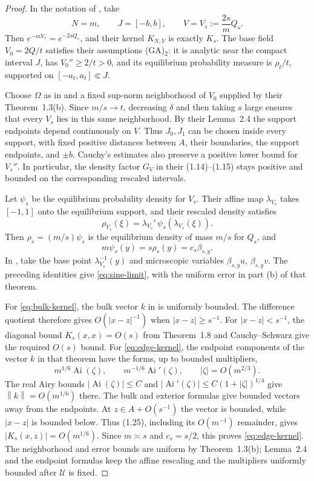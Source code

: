 \documentclass[11pt]{article}
\theoremstyle{definition}
\numberwithin{equation}{section}
\newcommand{\norm}[1]{\left\lVert #1\right\rVert}
\begin{document}
\begin{proof}
In the notation of \cite{KSSV}, take
\[
 N=m,\qquad J=[-b,b],\qquad V=V_s:=\frac{2s}{m}Q_s.
\]
Then \(e^{-mV_s}=e^{-2sQ_s}\), and their kernel \(K_{N,V}\) is
exactly \(K_s\). The base field \(V_0=2Q/t\) satisfies their
assumptions (GA)\(_2\): it is analytic near the compact interval
\(J\), has \(V_0''\ge2/t>0\), and its equilibrium probability
measure is \(\rho_t/t\), supported on \([-a_t,a_t]\Subset J\).

Choose \(\Omega\) as in \cite[Remark~1.1]{KSSV} and a fixed
sup-norm neighborhood of \(V_0\) supplied by their Theorem~1.3(b).
Since \(m/s\to t\), decreasing \(\delta\) and then taking \(s\)
large ensures that every \(V_s\) lies in this same neighborhood.
By their Lemma~2.4 the support endpoints depend continuously on
\(V\). Thus \(J_0,J_1\) can be chosen inside every support, with
fixed positive distances between \(A\), their boundaries, the
support endpoints, and \(\pm b\). Cauchy's estimates also preserve
a positive lower bound for \(V_s''\). In particular, the density
factor \(G_V\) in their (1.14)--(1.15) stays positive and bounded
on the corresponding rescaled intervals.

Let \(\psi_s\) be the equilibrium probability density for \(V_s\).
Their affine map \(\lambda_{V_s}\) takes \([-1,1]\) onto the
equilibrium support, and their rescaled density satisfies
\[
 \rho_{V_s}(\xi)=\lambda_{V_s}'\,
                  \psi_s(\lambda_{V_s}(\xi)).
\]
Then \(\rho_s=(m/s)\psi_s\) is the equilibrium density of mass \(m/s\)
for \(Q_s\), and
\[
 m\psi_s(y)=s\rho_s(y)=c_s\beta_{s,y}.
\]
In \cite[Theorem~1.8]{KSSV}, take the base point
\(\lambda_{V_s}^{-1}(y)\) and microscopic variables
\(\beta_{s,y}u\), \(\beta_{s,y}v\).
The preceding identities give \eqref{eq:sine-limit}, with the
uniform error in part (b) of that theorem.

For \eqref{eq:bulk-kernel}, the bulk vector \(k\) in
\cite[Theorem~1.3(a), (1.25)]{KSSV} is uniformly bounded.
The difference quotient therefore gives \(O(|x-z|^{-1})\) when
\(|x-z|\ge s^{-1}\). For \(|x-z|<s^{-1}\), the diagonal bound
\(K_s(x,x)=O(s)\) from Theorem~1.8 and Cauchy--Schwarz give the
required \(O(s)\) bound.
For \eqref{eq:edge-kernel}, the endpoint components of the vector
\(k\) in that theorem have the forms, up to bounded multipliers,
\[
 m^{1/6}\operatorname{Ai}(\zeta),\qquad
 m^{-1/6}\operatorname{Ai}'(\zeta),\qquad |\zeta|=O(m^{2/3}).
\]
The real Airy bounds \(|\operatorname{Ai}(\zeta)|\le C\) and
\(|\operatorname{Ai}'(\zeta)|\le C(1+|\zeta|)^{1/4}\) give
\(\norm{k}=O(m^{1/6})\) there. The bulk and exterior formulas give
bounded vectors away from the endpoints. At \(z\in A+O(s^{-1})\)
the vector is bounded, while \(|x-z|\) is bounded below.
Thus (1.25), including its \(O(m^{-1})\) remainder, gives
\(|K_s(x,z)|=O(m^{1/6})\). Since \(m\asymp s\) and \(c_s=s/2\),
this proves \eqref{eq:edge-kernel}.
The neighborhood and error bounds are uniform by Theorem~1.3(b);
Lemma~2.4 and the endpoint formulas keep the affine rescaling and
the multipliers uniformly bounded after \(\mathcal U\) is fixed.
\end{proof}
\end{document}
